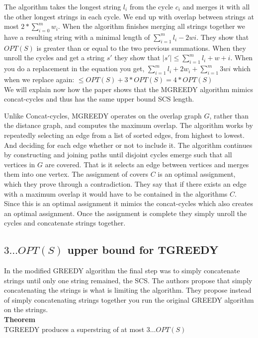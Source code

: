 \documentclass[letterpaper,11pt,titlepage]{article}
\begin{document}
The algorithm takes the longest string $l_i$ from the cycle $c_i$ and merges it with all the other longest strings in each cycle. We end up with overlap between strings at most $2*\sum_{i=0}^m w_i$. When the algorithm finishes merging all strings together we have a resulting string with a minimal length of $\sum_{i=1}^m l_i - 2wi$.  They show that $OPT(S)$ is greater than or equal to the two previous summations. When they unroll the cycles and get a string $s'$ they show that $|s'| \leq \sum_{i=1}^m l_i + w+i$. When you do a replacement in the equation you get, $\sum_{i=1}^m l_i + 2w_i + \sum_{i=1}^m 3wi$ which when we replace again: $\leq OPT(S) + 3 * OPT(S) = 4 * OPT(S)$\\

We will explain now how the paper shows that the MGREEDY algorithm mimics concat-cycles and thus has the same upper bound SCS length.

Unlike Concat-cycles, MGREEDY operates on the overlap graph $G$, rather than the distance graph, and computes the maximum overlap. The algorithm works by repeatedly selecting an edge from a list of sorted edges, from highest to lowest. And deciding for each edge whether or not to include it. The algorithm continues by constructing and joining paths until disjoint cycles emerge such that all vertices in $G$ are covered. That is it selects an edge between vertices and merges them into one vertex. The assignment of covers $C$ is an optimal assignment, which they prove through a contradiction. They say that if there exists an edge with a maximum overlap it would have to be contained in the algorithms $C$. Since this is an optimal assignment it mimics the concat-cycles which also creates an optimal assignment. Once the assignment is complete they simply unroll the cycles and concatenate strings together. 

\subsection*{$3 \ldots OPT(S)$ upper bound for TGREEDY}

In the modified GREEDY algorithm the final step was to simply concatenate strings until only one string remained, the SCS. The authors propose that simply concatenating the strings is what is limiting the algorithm. They propose instead of simply concatenating strings together you run the original GREEDY algorithm on the strings. \\

\textbf{Theorem}\\
TGREEDY produces a superstring of at most $3 \ldots OPT(S)$\\
\end{document}

